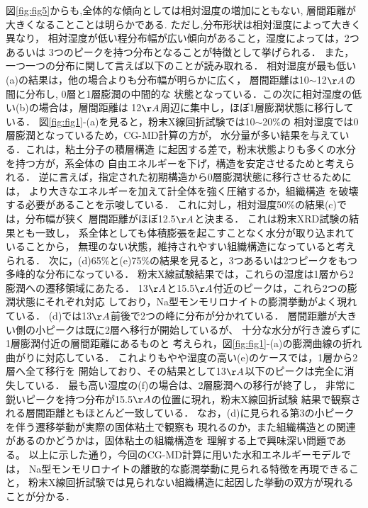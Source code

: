 図\ref{fig:fig5}からも,全体的な傾向としては相対湿度の増加にともない,
層間距離が大きくなることことは明らかである.
ただし,分布形状は相対湿度によって大きく異なり，
相対湿度が低い程分布幅が広い傾向があること，湿度によっては，2つあるいは
3つのピークを持つ分布となることが特徴として挙げられる．
また，一つ一つの分布に関して言えば以下のことが読み取れる．
相対湿度が最も低い(a)の結果は，他の場合よりも分布幅が明らかに広く，
層間距離は10$\sim$12$\AA$の間に分布し, 0層と1層膨潤の中間的な
状態となっている．この次に相対湿度の低い(b)の場合は，層間距離は
12$\AA$周辺に集中し，ほぼ1層膨潤状態に移行している．
図\ref{fig:fig1}-(a)を見ると，粉末X線回折試験では10$\sim$20$\%$の
相対湿度では0層膨潤となっているため，CG-MD計算の方が，
水分量が多い結果を与えている．これは，粘土分子の積層構造
に起因する差で，粉末状態よりも多くの水分を持つ方が，系全体の
自由エネルギーを下げ，構造を安定させるためと考えられる．
逆に言えば，指定された初期構造から0層膨潤状態に移行させるためには，
より大きなエネルギーを加えて計全体を強く圧縮するか，組織構造
を破壊する必要があることを示唆している．
これに対し，相対湿度50$\%$の結果(c)では，分布幅が狭く
層間距離がほぼ12.5$\AA$と決まる． これは粉末XRD試験の結果とも一致し，
系全体としても体積膨張を起こすことなく水分が取り込まれていることから，
無理のない状態，維持されやすい組織構造になっていると考えられる．
次に，(d)65$\%$と(e)75$\%$の結果を見ると，3つあるいは2つピークをもつ
多峰的な分布になっている．
粉末X線試験結果では，これらの湿度は1層から2膨潤への遷移領域にあたる．
13$\AA$と15.5$\AA$付近のピークは，これら2つの膨潤状態にそれぞれ対応
しており，Na型モンモリロナイトの膨潤挙動がよく現れている．
(d)では13$\AA$前後で2つの峰に分布が分かれている．
層間距離が大きい側の小ピークは既に2層へ移行が開始しているが、
十分な水分が行き渡らずに1層膨潤付近の層間距離にあるものと
考えられ，図\ref{fig:fig1}-(a)の膨潤曲線の折れ曲がりに対応している．
これよりもやや湿度の高い(e)のケースでは，1層から2層へ全て移行を
開始しており、その結果として13$\AA$以下のピークは完全に消失している．
最も高い湿度の(f)の場合は、2層膨潤への移行が終了し，
非常に鋭いピークを持つ分布が15.5$\AA$の位置に現れ，粉末X線回折試験
結果で観察される層間距離ともほとんど一致している．
なお，(d)に見られる第3の小ピークを伴う遷移挙動が実際の固体粘土で観察も
現れるのか，また組織構造との関連があるのかどうかは，固体粘土の組織構造を
理解する上で興味深い問題である。
以上に示した通り，今回のCG-MD計算に用いた水和エネルギーモデルでは，
Na型モンモリロナイトの離散的な膨潤挙動に見られる特徴を再現できること，
粉末X線回折試験では見られない組織構造に起因した挙動の双方が現れる
ことが分かる．
